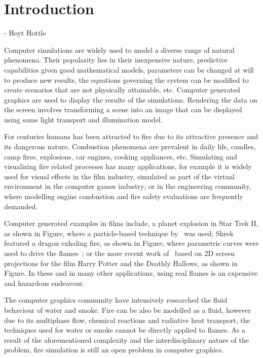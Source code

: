 \chapter{Introduction}
\label{ch:introduction}
 - Hoyt Hottle


Computer simulations are widely used to model a diverse range of natural phenomena.
Their popularity lies in their inexpensive nature, predictive capabilities given good mathematical models, parameters can be changed at will to produce new results, the equations governing the system can be modified to create scenarios that are not physically attainable, etc.
Computer generated graphics are used to display the results of the simulations.
Rendering the data on the screen involves transforming a scene into an image that can be displayed using some light transport and illumination model.

For centuries humans has been attracted to fire due to its attractive presence and its dangerous nature.
Combustion phenomena are prevalent in daily life, candles, camp fires, explosions, car engines, cooking appliances, etc.
Simulating and visualizing fire related processes has many applications, for example it is widely used for visual effects in the film industry, simulated as part of the virtual environment in the computer games industry; or in the engineering community, where modelling engine combustion and fire safety evaluations are frequently demanded.

Computer generated examples in films include, a planet explosion in Star Trek II, as shown in Figure, where a particle-based technique by~\cite{Reeves:1983} was used; Shrek featured a dragon exhaling fire, as shown in Figure, where parametric curves were used to drive the flames~\cite{Lamorlette:2002}; or the more recent work of~\cite{Horvath:2009} based on 2D screen projections for the film Harry Potter and the Deathly Hallows, as shown in Figure.
In these and in many other applications, using real flames is an expensive and hazardous endeavour.

The computer graphics community have intensively researched the fluid behaviour of water and smoke.
Fire can be also be modelled as a fluid, however due to its multiphase flow, chemical reactions and radiative heat transport, the techniques used for water or smoke cannot be directly applied to flames.
As a result of the aforementioned complexity and the interdisciplinary nature of the problem, fire simulation is still an open problem in computer graphics.

